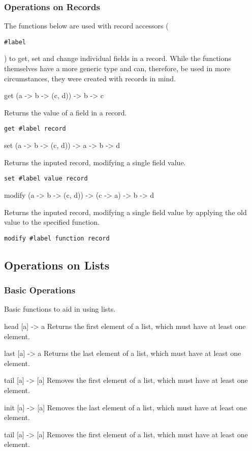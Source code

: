 \documentclass{article}
\def\code#1{\begin{footnotesize}\texttt{#1}\end{footnotesize}}
\begin{document}
\subsubsection{Operations on Records}

The functions below are used with record accessors (\code{\#label}) to get, set and change individual fields in a record.
While the functions themselves have a more generic type and can, therefore, be used in more circumstances, they were created with records in mind.

\medskip

\libfunction
  {get}
  {(a -> b -> (c, d)) -> b -> c}
  {Returns the value of a field in a record.

  \code{get \#label record}}

\libfunction
  {set}
  {(a -> b -> (c, d)) -> a -> b -> d}
  {Returns the inputed record, modifying a single field value.

  \code{set \#label value record}}

\libfunction
  {modify}
  {(a -> b -> (c, d)) -> (c -> a) -> b -> d}
  {Returns the inputed record, modifying a single field value by applying the old value to the specified function.

  \code{modify \#label function record}}

\subsection{Operations on Lists}

\subsubsection{Basic Operations}

Basic functions to aid in using lists.

\medskip

\libfunction
  {head}
  {[a] -> a}
  {Returns the first element of a list, which must have at least one element.}

\libfunction
  {last}
  {[a] -> a}
  {Returns the last element of a list, which must have at least one element.}

\libfunction
  {tail}
  {[a] -> [a]}
  {Removes the first element of a list, which must have at least one element.}

\libfunction
  {init}
  {[a] -> [a]}
  {Removes the last element of a list, which must have at least one element.}

\libfunction
  {tail}
  {[a] -> [a]}
  {Removes the first element of a list, which must have at least one element.}
\end{document}
